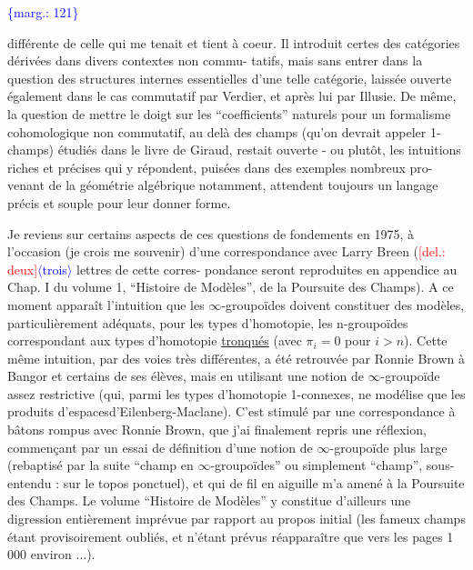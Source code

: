 \documentclass[11pt]{article}
\newcommand{\scanpage}[1]{\par\bigskip\noindent{\small\sffamily[scan #1]}\par}
\newcommand{\mspage}[1]{{\small\sffamily[p.\,#1]}}
\newcommand{\inserted}[2][]{\textcolor{blue}{$\langle$#2$\rangle$}}
\newcommand{\margin}[1]{\textcolor{blue}{\{\textsf{marg.:} #1\}}}
\newcommand{\deleted}[1]{\textcolor{red}{[\textsf{del.:} #1]}}
\newcommand{\uline}[1]{\underline{#1}}
\begin{document}
\margin{121}

\clearpage
\scanpage{119/122}
\mspage{44}

différente de celle qui me tenait et tient à coeur. Il introduit
certes des catégories dérivées dans divers contextes non commu-%
tatifs, mais sans entrer dans la question des structures internes
essentielles d'une telle catégorie, laissée ouverte également
dans le cas commutatif par Verdier, et après lui par Illusie. De
même, la question de mettre le doigt sur les ``coefficients''
naturels pour un formalisme cohomologique non commutatif, au delà
des champs (qu'on devrait appeler 1-champs) étudiés dans le livre
de Giraud, restait ouverte - ou plutôt, les intuitions riches et
précises qui y répondent, puisées dans des exemples nombreux pro-%
venant de la géométrie algébrique notamment, attendent toujours
un langage précis et souple pour leur donner forme.

Je reviens sur certains aspects de ces questions de
fondements en 1975, à l'occasion (je crois me souvenir) d'une
correspondance avec Larry Breen (\deleted{deux}\inserted{trois} lettres de cette corres-%
pondance seront reproduites en appendice au Chap. I du volume 1,
``Histoire de Modèles'', de la Poursuite des Champs). A ce moment
apparaît l'intuition que les $\infty$-groupoïdes doivent constituer des
modèles, particulièrement adéquats, pour les types d'homotopie,
les n-groupoïdes correspondant aux types d'homotopie \uline{tronqués}
(avec $\pi_i = 0$ pour $i > n$). Cette même intuition, par des voies
très différentes, a été retrouvée par Ronnie Brown à Bangor et
certains de ses élèves, mais en utilisant une notion de $\infty$-groupoïde
assez restrictive (qui, parmi les types d'homotopie 1-connexes,
ne modélise que les produits d'espacesd'Eilenberg-Maclane). C'est
stimulé par une correspondance à bâtons rompus avec Ronnie Brown,
que j'ai finalement repris une réflexion, commençant par un essai
de définition d'une notion de $\infty$-groupoïde plus large (rebaptisé
par la suite ``champ en $\infty$-groupoïdes'' ou simplement ``champ'', sous-%
entendu : sur le topos ponctuel), et qui de fil en aiguille m'a
amené à la Poursuite des Champs. Le volume ``Histoire de Modèles''
y constitue d'ailleurs une digression entièrement imprévue par
rapport au propos initial (les fameux champs étant provisoirement
oubliés, et n'étant prévus réapparaître que vers les pages 1 000
environ ...).
\end{document}
